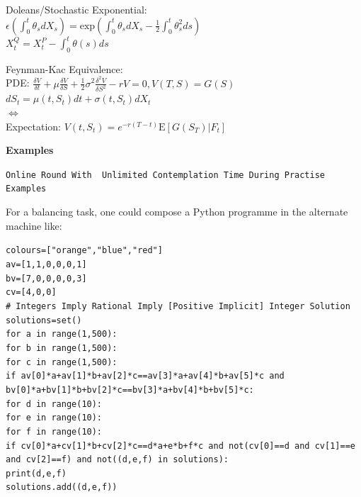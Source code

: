 Doleans/Stochastic Exponential: \\
$\epsilon \left( \int_0^t \theta_s dX_s \right) = \text{exp}\left( \int_0^t \theta_s dX_s - \frac{1}{2}\int_0^t \theta_s^2 ds \right)$ \\
$X_t^Q = X_t^P - \int_0^t \theta(s)ds$

Feynman-Kac Equivalence: \\
PDE: $\frac{\delta V}{\delta t}+\mu \frac{\delta V}{\delta S} + \frac{1}{2} \sigma^2 \frac{\delta^2 V}{\delta S^2} -rV = 0 , V(T,S)=G(S)$ \\
$dS_t = \mu (t,S_t)dt+\sigma (t,S_t) dX_t$ \\
$\iff$ \\
Expectation: $V(t,S_t)=e^{-r(T-t)}\text{E}[G(S_T)|F_t]$

\newpage
\onecolumn

\textbf{Examples}

\texttt{Online Round With ~Unlimited Contemplation Time During Practise Examples}

For a balancing task, one could compose a Python programme in the alternate machine like:

\phantom{xxxx}\texttt{colours=["orange","blue","red"]} \\
\phantom{xxxx}\texttt{av=[1,1,0,0,0,1]} \\
\phantom{xxxx}\texttt{bv=[7,0,0,0,0,3]} \\
\phantom{xxxx}\texttt{cv=[4,0,0]} \\
\phantom{xxxx}\texttt{\# Integers Imply Rational Imply [Positive Implicit] Integer Solution} \\
\phantom{xxxx}\texttt{solutions=set()} \\
\phantom{xxxx}\texttt{for a in range(1,500):} \\
\phantom{xxxxxxxx}\texttt{for b in range(1,500):} \\
\phantom{xxxxxxxxxxxx}\texttt{for c in range(1,500):} \\
\phantom{xxxxxxxxxxxxxxxx}\texttt{if av[0]*a+av[1]*b+av[2]*c==av[3]*a+av[4]*b+av[5]*c and bv[0]*a+bv[1]*b+bv[2]*c==bv[3]*a+bv[4]*b+bv[5]*c:} \\
\phantom{xxxxxxxxxxxxxxxxxxxx}\texttt{for d in range(10):} \\
\phantom{xxxxxxxxxxxxxxxxxxxxxxxx}\texttt{for e in range(10):} \\
\phantom{xxxxxxxxxxxxxxxxxxxxxxxxxxxx}\texttt{for f in range(10):} \\
\phantom{xxxxxxxxxxxxxxxxxxxxxxxxxxxxxxxx}\texttt{if cv[0]*a+cv[1]*b+cv[2]*c==d*a+e*b+f*c and not(cv[0]==d and cv[1]==e and cv[2]==f) and not((d,e,f) in solutions):} \\
\phantom{xxxxxxxxxxxxxxxxxxxxxxxxxxxxxxxxxxxx}\texttt{print(d,e,f)} \\
\phantom{xxxxxxxxxxxxxxxxxxxxxxxxxxxxxxxxxxxx}\texttt{solutions.add((d,e,f))}


